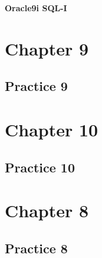 \documentclass[a4paper,12pt]{article}
\begin{document}
\begin{titlepage}
    
\end{titlepage}
\begin{center}
        \textbf{\LARGE Oracle9i SQL-I}
\end{center}

\section*{Chapter 9}
\subsection*{Practice 9}


\newpage
\section*{Chapter 10}
\subsection*{Practice 10}


\newpage
\section*{Chapter 8}
\subsection*{Practice 8}

\end{document}
